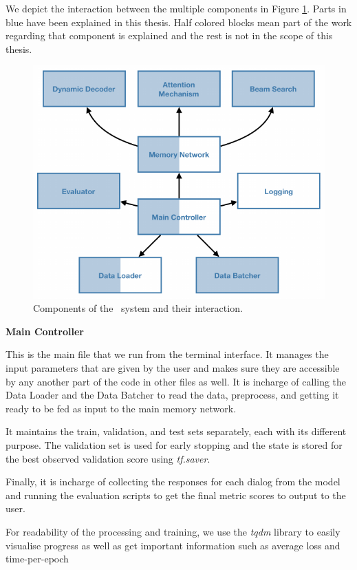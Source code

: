 We depict the interaction between the multiple components in Figure \ref{fig:sys_comp}. Parts in blue have been explained in this thesis. Half colored blocks mean part of the work regarding that component is explained and the rest is not in the scope of this thesis.

\begin{figure}[!ht]
\centering
\includegraphics[scale=1.0]{assets/figures/components_orig.pdf}
\caption{Components of the \sys\ system and their interaction.}
\label{fig:sys_comp}
\end{figure}

\noindent\textbf{Main Controller}

This is the main file that we run from the terminal interface. It manages the input parameters that are given by the user and makes sure they are accessible by any another part of the code in other files as well. It is incharge of calling the Data Loader and the Data Batcher to read the data, preprocess, and getting it ready to be fed as input to the main memory network. 

It maintains the train, validation, and test sets separately, each with its different purpose. The validation set is used for early stopping and the state is stored for the best observed validation score using \emph{tf.saver}.

Finally, it is incharge of collecting the responses for each dialog from the model and running the evaluation scripts to get the final metric scores to output to the user. 

For readability of the processing and training, we use the \emph{tqdm} library to easily visualise progress as well as get important information such as average loss and time-per-epoch

